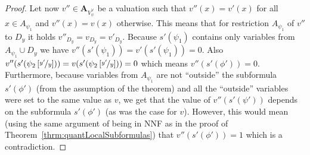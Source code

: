 \documentclass[
  digital, %
  color,
  twoside, %
  table,   %
  nolof,     %
  nolot,     %
]{fithesis3}
\theoremstyle{definition}
\theoremstyle{remark}
\newcommand{\substitute}[2]{\left[ \nicefrac{#2}{#1} \right]}
\newcommand{\valtns}[1]{\mathbf{A}_{#1}}
\newcommand{\uvars}[1]{V_{#1}^{\forall}}
\newcommand{\Scands}[1]{\mathbb{S}_{#1}}
\begin{document}
\begin{proof}
  Let now $v'' \in \valtns{\uvars{\psi}}$ be a valuation such that $v''(x) = v'(x)$ for all $x \in A_{\psi_1}$ and $v''(x) = v(x)$ otherwise. This means that for restriction $A_{\psi_1}$ of $v''$ to $D_y$ it holds $v''_{D_y} = v_{D_y} = v'_{D_y}$. Because $s'(\psi_1)$ contains only variables from $A_{\psi_1} \cup D_y$ we have $v''(s'(\psi_1)) = v'(s'(\psi_1)) = 0$. Also $v''(s'(\psi_2\substitute{y}{y'})) = v(s'(\psi_2\substitute{y}{y'})) = 0$ which means $v''(s'(\phi')) = 0$. Furthermore, because variables from $A_{\psi_1}$ are not ``outside'' the subformula $s'(\phi')$ (from the assumption of the theorem) and all the ``outside'' variables were set to the same value as $v$, we get that the value of $v''(s'(\psi'))$ depends on the subformula $s'(\phi')$ (as was the case for $v$). However, this would mean (using the same argument of being in NNF as in the proof of Theorem~\ref{thrm:quantLocalSubformulas}) that $v''(s'(\phi')) = 1$ which is a contradiction.
\end{proof}
\end{document}

